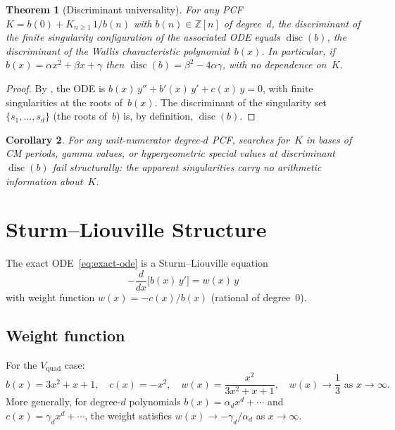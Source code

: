 \documentclass[11pt,a4paper]{amsart}
\theoremstyle{plain}
\newtheorem{theorem}{Theorem}[section]
\newtheorem{corollary}[theorem]{Corollary}
\theoremstyle{definition}
\theoremstyle{remark}
\newcommand{\Z}{\mathbb{Z}}
\newcommand{\disc}{\operatorname{disc}}
\newcommand{\Vquad}{V_{\mathrm{quad}}}
\begin{document}
\begin{theorem}[Discriminant universality]\label{thm:disc}
For any PCF $K = b(0) + K_{n\ge 1}\,1/b(n)$ with
$b(n)\in\Z[n]$ of degree~$d$, the discriminant of the
finite singularity configuration of the associated ODE
equals $\disc(b)$, the discriminant of the Wallis
characteristic polynomial~$b(x)$.
In particular, if $b(x) = \alpha x^2 + \beta x + \gamma$ then
$\disc(b) = \beta^2 - 4\alpha\gamma$, with no dependence on~$K$.
\end{theorem}

\begin{proof}
By , the ODE is
$b(x)\,y'' + b'(x)\,y' + c(x)\,y = 0$, with finite singularities
at the roots of~$b(x)$.  The discriminant of the singularity
set $\{s_1,\ldots,s_d\}$ (the roots of~$b$) is, by definition,
$\disc(b)$.
\end{proof}

\begin{corollary}\label{cor:cm-failure}
For any unit-numerator degree-$d$ PCF, searches for~$K$ in bases
of CM periods, gamma values, or hypergeometric special values
at discriminant~$\disc(b)$ fail \emph{structurally}: the apparent
singularities carry no arithmetic information about~$K$.
\end{corollary}

\section{Sturm--Liouville Structure}\label{sec:SL}

The exact ODE~\eqref{eq:exact-ode} is a Sturm--Liouville equation
\begin{equation}\label{eq:SL}
  -\frac{d}{dx}\bigl[b(x)\,y'\bigr] = w(x)\,y
\end{equation}
with weight function $w(x) = -c(x)/b(x)$ (rational of degree~$0$).

\subsection{Weight function}
For the $\Vquad$ case:
\[
  b(x) = 3x^2+x+1, \quad c(x) = -x^2, \quad
  w(x) = \frac{x^2}{3x^2+x+1}, \quad
  w(x) \to \frac{1}{3} \text{ as } x\to\infty.
\]
More generally, for degree-$d$ polynomials $b(x) = \alpha_d x^d + \cdots$
and $c(x) = \gamma_d x^d + \cdots$, the weight satisfies
$w(x) \to -\gamma_d/\alpha_d$ as $x\to\infty$.
\end{document}
